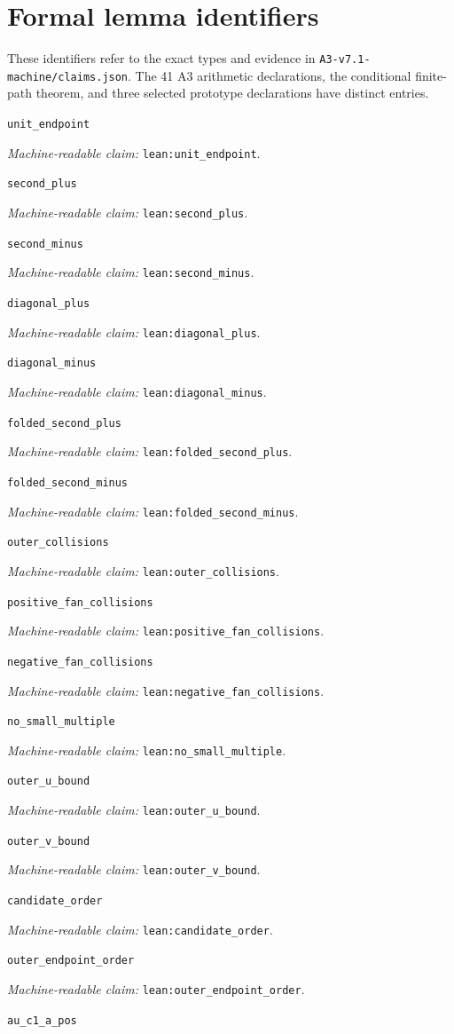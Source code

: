 \documentclass[11pt]{amsart}
\newcommand{\record}[1]{\nolinkurl{#1}}
\newcommand{\claimid}[1]{\par\nopagebreak\noindent\textit{Machine-readable claim:} \record{#1}.\par}
\begin{document}
\section*{Formal lemma identifiers}
These identifiers refer to the exact types and evidence in \record{A3-v7.1-machine/claims.json}.
The 41 A3 arithmetic declarations, the conditional finite-path theorem,
and three selected prototype declarations have distinct entries.
\par\noindent\label{lean:unit_endpoint}\record{unit_endpoint}
\claimid{lean:unit_endpoint}
\par\noindent\label{lean:second_plus}\record{second_plus}
\claimid{lean:second_plus}
\par\noindent\label{lean:second_minus}\record{second_minus}
\claimid{lean:second_minus}
\par\noindent\label{lean:diagonal_plus}\record{diagonal_plus}
\claimid{lean:diagonal_plus}
\par\noindent\label{lean:diagonal_minus}\record{diagonal_minus}
\claimid{lean:diagonal_minus}
\par\noindent\label{lean:folded_second_plus}\record{folded_second_plus}
\claimid{lean:folded_second_plus}
\par\noindent\label{lean:folded_second_minus}\record{folded_second_minus}
\claimid{lean:folded_second_minus}
\par\noindent\label{lean:outer_collisions}\record{outer_collisions}
\claimid{lean:outer_collisions}
\par\noindent\label{lean:positive_fan_collisions}\record{positive_fan_collisions}
\claimid{lean:positive_fan_collisions}
\par\noindent\label{lean:negative_fan_collisions}\record{negative_fan_collisions}
\claimid{lean:negative_fan_collisions}
\par\noindent\label{lean:no_small_multiple}\record{no_small_multiple}
\claimid{lean:no_small_multiple}
\par\noindent\label{lean:outer_u_bound}\record{outer_u_bound}
\claimid{lean:outer_u_bound}
\par\noindent\label{lean:outer_v_bound}\record{outer_v_bound}
\claimid{lean:outer_v_bound}
\par\noindent\label{lean:candidate_order}\record{candidate_order}
\claimid{lean:candidate_order}
\par\noindent\label{lean:outer_endpoint_order}\record{outer_endpoint_order}
\claimid{lean:outer_endpoint_order}
\par\noindent\label{lean:au_c1_a_pos}\record{au_c1_a_pos}
\end{document}
